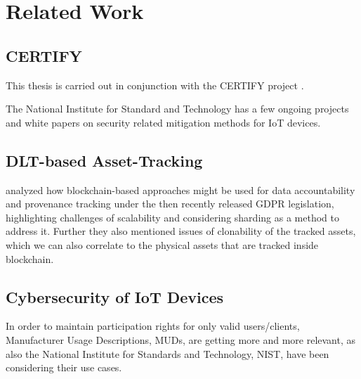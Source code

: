 \chapter{Related Work}


\section{CERTIFY} %
\label{sec:CERTIFY}
This thesis is carried out in conjunction with the CERTIFY project \cite{certifyproject2023}.

The National Institute for Standard and Technology has a few ongoing projects and white papers on security related
mitigation methods for IoT devices.


\section{DLT-based Asset-Tracking} %
\label{sec:DLT-based Asset-Tracking}
\cite{neisse2017blockchain} analyzed how blockchain-based approaches might be used for data accountability and
provenance tracking under the then recently released GDPR legislation, highlighting challenges of scalability and
considering sharding as a method to address it. \cite{neisse2017blockchain} Further they also mentioned issues of
clonability of the tracked assets, which we can also correlate to the physical assets that are tracked inside
blockchain.


\section{Cybersecurity of IoT Devices} %
\label{sec:Cybersecurity of IoT Devices}

In order to maintain participation rights for only valid users/clients, Manufacturer Usage Descriptions, MUDs, are
getting more and more relevant, as also the National Institute for Standards and Technology, NIST, have been considering
their use cases. \cite{dodson2021securing}


